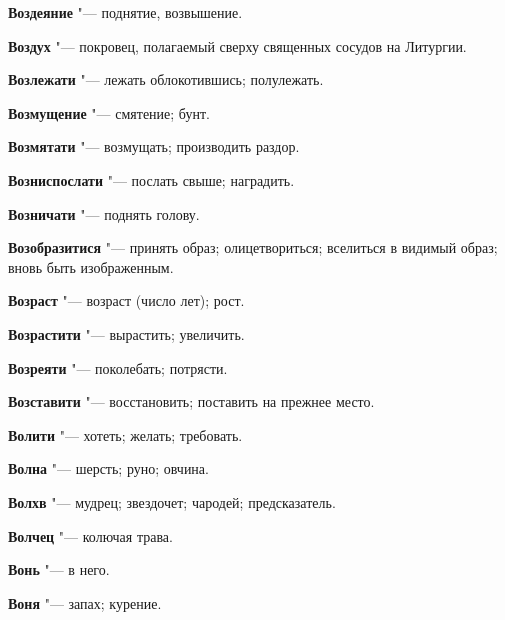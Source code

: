 \begin{mymulticols}{2}
\noindent\textbf{Воздеяние} "--- поднятие, возвышение. 




\noindent\textbf{Воздух} "--- покровец, полагаемый сверху священных сосудов на Литургии. 




\noindent\textbf{Возлежати} "--- лежать облокотившись; полулежать. 




\noindent\textbf{Возмущение} "--- смятение; бунт. 




\noindent\textbf{Возмятати} "--- возмущать; производить раздор. 




\noindent\textbf{Возниспослати} "--- послать свыше; наградить. 




\noindent\textbf{Возничати} "--- поднять голову. 




\noindent\textbf{Возобразитися} "--- принять образ; олицетвориться; вселиться в видимый образ; вновь быть изображенным. 




\noindent\textbf{Возраст} "--- возраст (число лет); рост. 




\noindent\textbf{Возрастити} "--- вырастить; увеличить. 




\noindent\textbf{Возреяти} "--- поколебать; потрясти. 




\noindent\textbf{Возставити} "--- восстановить; поставить на прежнее место. 




\noindent\textbf{Волити} "--- хотеть; желать; требовать. 




\noindent\textbf{Волна} "--- шерсть; руно; овчина. 




\noindent\textbf{Волхв} "--- мудрец; звездочет; чародей; предсказатель. 




\noindent\textbf{Волчец} "--- колючая трава. 




\noindent\textbf{Вонь} "--- в него. 




\noindent\textbf{Воня} "--- запах; курение. 





\end{mymulticols}
